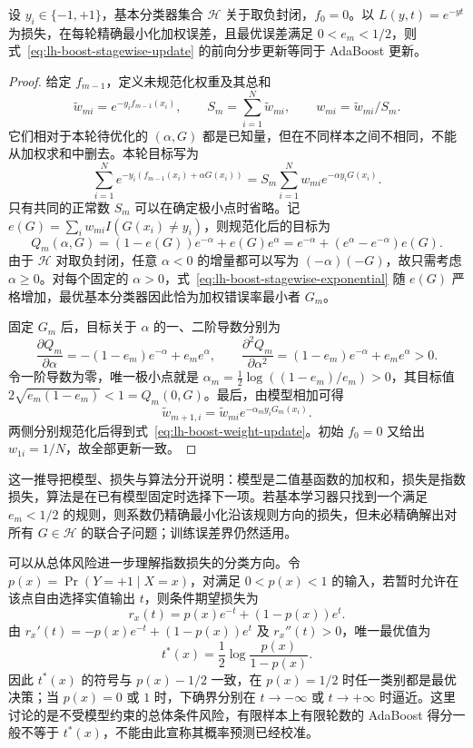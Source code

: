 \begin{proposition}
\label{prop:lh-boost-stagewise-adaboost}
设 $y_i\in\{-1,+1\}$，基本分类器集合 $\mathcal H$ 关于取负封闭，$f_0=0$。以 $L(y,t)=e^{-yt}$ 为损失，在每轮精确最小化加权误差，且最优误差满足 $0<e_m<1/2$，则式~\eqref{eq:lh-boost-stagewise-update} 的前向分步更新等同于 AdaBoost 更新。
\end{proposition}
\begin{proof}
给定 $f_{m-1}$，定义未规范化权重及其总和
\[
 \widetilde w_{mi}=e^{-y_if_{m-1}(x_i)},\qquad
 S_m=\sum_{i=1}^{N}\widetilde w_{mi},\qquad
 w_{mi}=\widetilde w_{mi}/S_m.
\]
它们相对于本轮待优化的 $(\alpha,G)$ 都是已知量，但在不同样本之间不相同，不能从加权求和中删去。本轮目标写为
\[
 \sum_{i=1}^{N}e^{-y_i(f_{m-1}(x_i)+\alpha G(x_i))}
 =S_m\sum_{i=1}^{N}w_{mi}e^{-\alpha y_iG(x_i)}.
\]
只有共同的正常数 $S_m$ 可以在确定极小点时省略。记 $e(G)=\sum_iw_{mi}I(G(x_i)\ne y_i)$，则规范化后的目标为
\begin{equation}
 Q_m(\alpha,G)=(1-e(G))e^{-\alpha}+e(G)e^{\alpha}
              =e^{-\alpha}+(e^{\alpha}-e^{-\alpha})e(G).
 \label{eq:lh-boost-stagewise-exponential}
\end{equation}
由于 $\mathcal H$ 对取负封闭，任意 $\alpha<0$ 的增量都可以写为 $(-\alpha)(-G)$，故只需考虑 $\alpha\geq0$。对每个固定的 $\alpha>0$，式~\eqref{eq:lh-boost-stagewise-exponential} 随 $e(G)$ 严格增加，最优基本分类器因此恰为加权错误率最小者 $G_m$。

固定 $G_m$ 后，目标关于 $\alpha$ 的一、二阶导数分别为
\[
 \frac{\partial Q_m}{\partial\alpha}=-(1-e_m)e^{-\alpha}+e_me^{\alpha},\qquad
 \frac{\partial^2Q_m}{\partial\alpha^2}=(1-e_m)e^{-\alpha}+e_me^{\alpha}>0.
\]
令一阶导数为零，唯一极小点就是 $\alpha_m=\tfrac12\log((1-e_m)/e_m)>0$，其目标值 $2\sqrt{e_m(1-e_m)}<1=Q_m(0,G)$。最后，由模型相加可得
\[
 \widetilde w_{m+1,i}=\widetilde w_{mi}e^{-\alpha_my_iG_m(x_i)}.
\]
两侧分别规范化后得到式~\eqref{eq:lh-boost-weight-update}。初始 $f_0=0$ 又给出 $w_{1i}=1/N$，故全部更新一致。
\end{proof}

这一推导把模型、损失与算法分开说明：模型是二值基函数的加权和，损失是指数损失，算法是在已有模型固定时选择下一项。若基本学习器只找到一个满足 $e_m<1/2$ 的规则，则系数仍精确最小化沿该规则方向的损失，但未必精确解出对所有 $G\in\mathcal H$ 的联合子问题；训练误差界仍然适用。

\begin{remark}
\label{rem:lh-boost-conditional-risk}
可以从总体风险进一步理解指数损失的分类方向。令 $p(x)=\Pr(Y=+1\mid X=x)$，对满足 $0<p(x)<1$ 的输入，若暂时允许在该点自由选择实值输出 $t$，则条件期望损失为
\[
 r_x(t)=p(x)e^{-t}+(1-p(x))e^t.
\]
由 $r_x'(t)=-p(x)e^{-t}+(1-p(x))e^t$ 及 $r_x''(t)>0$，唯一最优值为
\[
 t^*(x)=\frac12\log\frac{p(x)}{1-p(x)}.
\]
因此 $t^*(x)$ 的符号与 $p(x)-1/2$ 一致，在 $p(x)=1/2$ 时任一类别都是最优决策；当 $p(x)=0$ 或 $1$ 时，下确界分别在 $t\to-\infty$ 或 $t\to+\infty$ 时逼近。这里讨论的是不受模型约束的总体条件风险，有限样本上有限轮数的 AdaBoost 得分一般不等于 $t^*(x)$，不能由此宣称其概率预测已经校准。
\end{remark}

